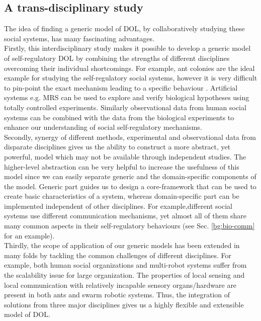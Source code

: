 \subsection*{A trans-disciplinary study}
The idea of finding a generic model of DOL, by collaboratively  studying these social systems, has many fascinating advantages.\\
Firstly, this interdisciplinary study makes it possible to develop a generic model of self-regulatory DOL by combining the strengths of different disciplines overcoming their individual shortcomings. For example, ant colonies are the ideal example for studying the self-regulatory social systems, however it is very difficult to pin-point the exact mechanism leading to a specific behaviour \cite{Arcaute+2008}. Artificial systems e.g.  MRS can be used to explore and verify biological hypotheses using totally controlled experiments. Similarly observational data from human social systems can be combined with the data from the biological experiments to enhance our understanding of social self-regulatory mechanisms.\\ 
Secondly, synergy of different methods, experimental and observational data from disparate disciplines gives us the ability to construct a more abstract, yet powerful, model which may not be available through independent studies. The higher-level abstraction can be very helpful to increase the usefulness of this model since we can easily separate generic and the domain-specific components of the model. Generic part guides us to design a core-framework that can be used to create basic characteristics of a system, whereas domain-specific part can be implemented independent of other disciplines. For example,different social systems use different communication mechanisms, yet almost all of them share many common aspects in their self-regulatory behaviours (see Sec. \ref{bg:bio-comm} for an example). \\
Thirdly,  the scope of application of our generic models has been extended in many folds by tackling the common challenges of different disciplines. For example, both human social organizations and multi-robot systems suffer from the scalability issue for large organization. The properties of local sensing and local communication with relatively incapable sensory organs/hardware are present in both ants and swarm robotic systems. Thus, the integration of solutions from three major disciplines gives us a highly flexible and extensible model of DOL.\\
